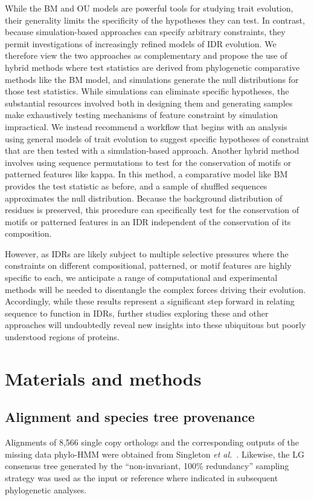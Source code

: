 While the BM and OU models are powerful tools for studying trait evolution, their generality limits the specificity of the hypotheses they can test. In contrast, because simulation-based approaches can specify arbitrary constraints, they permit investigations of increasingly refined models of IDR evolution. We therefore view the two approaches as complementary and propose the use of hybrid methods where test statistics are derived from phylogenetic comparative methods like the BM model, and simulations generate the null distributions for those test statistics. While simulations can eliminate specific hypotheses, the substantial resources involved both in designing them and generating samples make exhaustively testing mechanisms of feature constraint by simulation impractical. We instead recommend a workflow that begins with an analysis using general models of trait evolution to suggest specific hypotheses of constraint that are then tested with a simulation-based approach. Another hybrid method involves using sequence permutations to test for the conservation of motifs or patterned features like kappa. In this method, a comparative model like BM provides the test statistic as before, and a sample of shuffled sequences approximates the null distribution. Because the background distribution of residues is preserved, this procedure can specifically test for the conservation of motifs or patterned features in an IDR independent of the conservation of its composition.

However, as IDRs are likely subject to multiple selective pressures where the constraints on different compositional, patterned, or motif features are highly specific to each, we anticipate a range of computational and experimental methods will be needed to disentangle the complex forces driving their evolution. Accordingly, while these results represent a significant step forward in relating sequence to function in IDRs, further studies exploring these and other approaches will undoubtedly reveal new insights into these ubiquitous but poorly understood regions of proteins.

\section{Materials and methods}
\subsection{Alignment and species tree provenance}
Alignments of 8,566 single copy orthologs and the corresponding outputs of the missing data phylo-HMM were obtained from Singleton \textit{et al.}~\cite{Singleton2023}. Likewise, the LG consensus tree generated by the ``non-invariant, 100\% redundancy'' sampling strategy was used as the input or reference where indicated in subsequent phylogenetic analyses.

